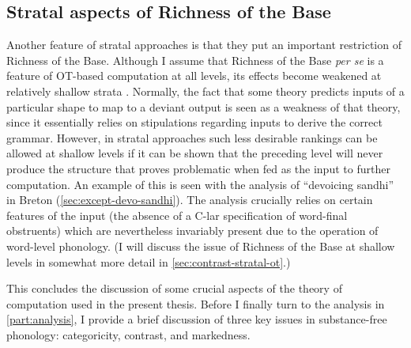 \subsection{Stratal aspects of Richness of the Base}
\label{sec:strat-aspects-richn}

Another feature of stratal approaches is that they put an important restriction of Richness of the Base. Although I assume that Richness of the Base \emph{per se} is a feature of OT\hyp based computation at all levels, its effects become weakened at relatively shallow strata \citep[\cfm][]{kiparsky08:_fenno_swedis,kiparsky11:_chain,bermudez-otero07:_marked}. Normally, the fact that some theory predicts inputs of a particular shape to map to a deviant output is seen as a weakness of that theory, since it essentially relies on stipulations regarding inputs to derive the correct grammar. However, in stratal approaches such less desirable rankings can be allowed at shallow levels if it can be shown that the preceding level will never produce the structure that proves problematic when fed as the input to further computation. An example of this is seen with the analysis of \enquote{devoicing sandhi} in Breton (\cref{sec:except-devo-sandhi}). The analysis crucially relies on certain features of the input (the absence of a C-lar specification of word\hyp final obstruents) which are nevertheless invariably present due to the operation of word\hyp level phonology. (I will discuss the issue of Richness of the Base at shallow levels in somewhat more detail in \cref{sec:contrast-stratal-ot}.)

This concludes the discussion of some crucial aspects of the theory of computation used in the present thesis. Before I finally turn to the analysis in \cref{part:analysis}, I provide a brief discussion of three key issues in substance\hyp free phonology: categoricity, contrast, and markedness.






























%